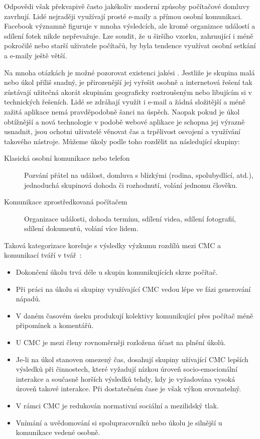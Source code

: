 \documentclass[12pt,oneside,final]{fithesis2}
\begin{document}
Odpovědi však překvapivě často jakékoliv moderní způsoby počítačové domluvy zavrhují. Lidé nejraději využívají prosté e-maily a přímou osobní komunikaci. Facebook významně figuruje v mnoha výsledcích, ale kromě organizace událostí a sdílení fotek nikde nepřevažuje. Lze soudit, že u širšího vzorku, zahrnující i méně pokročilé nebo starší uživatele počítačů, by byla tendence využívat osobní setkání a e-maily ještě větší.

Na mnoha otázkách je možné pozorovat existenci jakési . Jestliže je skupina malá nebo úkol příliš snadný, je přirozenější jej vyřešit osobně a internetová řešení tak zůstávají užitečná akorát skupinám geograficky roztroušeným nebo libujícím si v technických řešeních. Lidé se zdráhají využít i e-mail a žádná složitější a méně zažitá aplikace nemá pravděpodobně šanci na úspěch. Naopak pokud je úkol obtížnější a nová technologie v podobě webové aplikace je schopna jej výrazně usnadnit, jsou ochotni uživatelé věnovat čas a trpělivost osvojení a využívání takového nástroje. Můžeme úkoly podle toho rozdělit na následující skupiny:

\begin{description}
    \item[Klasická osobní komunikace nebo telefon] Pozvání přátel na událost, domluva s blízkými (rodina, spolubydlící, atd.), jednoduchá skupinová dohoda či rozhodnutí, volání jednomu člověku.
    \item[Komunikace zprostředkovaná počítačem] Organizace události, dohoda termínu, sdílení videa, sdílení fotografií, sdílení dokumentů, volání více lidem.
\end{description}

Taková kategorizace koreluje s výsledky výzkumu rozdílů mezi CMC a komunikací tváří v tvář~\cite{bordia1997face}:

\begin{itemize}
    \item Dokončení úkolu trvá déle u skupin komunikujících skrze počítač.
    \item Při práci na úkolu si skupiny využívající CMC vedou lépe ve fázi generování nápadů.
    \item V daném časovém úseku produkují kolektivy komunikující přes počítač méně připomínek a komentářů.
    \item U CMC je mezi členy rovnoměrněji rozložena účast na plnění úkolů.
    \item Je-li na úkol stanoven omezený čas, dosahují skupiny užívající CMC lepších výsledků při činnostech, které vyžadují nízkou úroveň socio-emocionální interakce a současně horších výsledků tehdy, kdy je vyžadována vysoká úroveň takové interakce. Při dostatečném čase je však výkon srovnatelný.
    \item V rámci CMC je redukován normativní sociální a mezilidský tlak.
    \item Vnímání a uvědomování si spolupracovníků nebo úkolu je silnější u komunikace vedené osobně.
\end{itemize}
\end{document}
